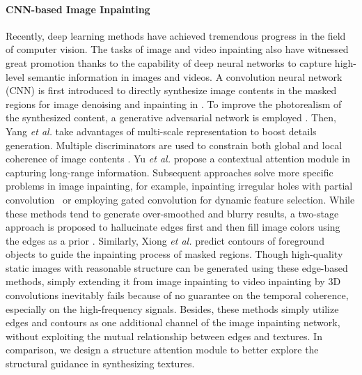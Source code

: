 \paragraph{CNN-based Image Inpainting}
Recently, deep learning methods have achieved tremendous progress in the field
of computer vision. The tasks of image and video inpainting also have witnessed great promotion thanks to the capability of deep neural networks to capture high-level semantic information in images and videos.
%
A convolution neural network (CNN) is first introduced to directly synthesize image contents in the masked regions for image denoising and inpainting in \cite{xie2012image}.
To improve the photorealism of the synthesized content, a generative adversarial network is employed \cite{pathak2016context}. 
Then, Yang \emph{et al.} \cite{yang2017high} take advantages of multi-scale representation to boost details generation.
Multiple discriminators are used to constrain both global and local coherence of image contents \cite{iizuka2017globally}.  
Yu \emph{et al.} \cite{yu2018generative} propose a contextual attention module in capturing long-range information.
Subsequent approaches solve more specific problems in image inpainting, for example, inpainting irregular holes with partial convolution~\cite{liu2018partialinpainting} or employing gated convolution \cite{yu2018free} for dynamic feature selection. 
While these methods tend to generate over-smoothed and blurry results, a two-stage approach is proposed to hallucinate edges first and then fill image colors using the edges as a prior \cite{nazeri2019edgeconnect}. 
Similarly, Xiong \emph{et al.} \cite{Xiong_2019_CVPR} predict contours of foreground objects to guide the inpainting process of masked regions.
Though high-quality static images with reasonable structure can be generated using these edge-based methods, simply extending it from image inpainting to video inpainting by 3D convolutions inevitably fails because of no guarantee on the temporal coherence, especially on the high-frequency signals. 
Besides, these methods simply utilize edges and contours as one additional channel of the image inpainting network, without exploiting the mutual relationship between edges and textures. 
In comparison, we design a structure attention module to better explore the structural guidance in synthesizing textures. 


